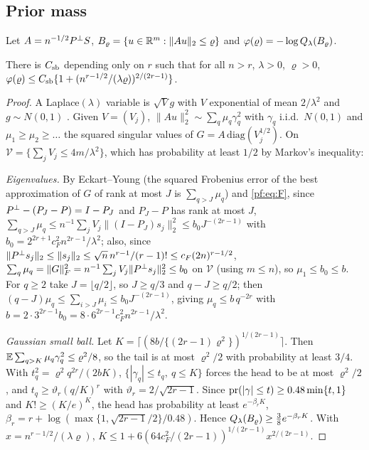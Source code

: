 \subsection{Prior mass}

Let $A=n^{-1/2}P^{\perp} S$, $B_\varrho=\{u\in\mathbb{R}^m:\|Au\|_2\le\varrho\}$ and $\varphi(\varrho)=-\log Q_\lambda(B_\varrho)$.

\begin{lemma}\label{pf:lem:sb}
There is $C_{\rm sb}$ depending only on $r$ such that for all $n>r$, $\lambda>0$, $\varrho>0$,
$\varphi(\varrho)\le C_{\rm sb}\{1+(n^{r-1/2}/(\lambda\varrho))^{2/(2r-1)}\}$.
\end{lemma}

\begin{proof}
A Laplace$(\lambda)$ variable is $\sqrt Vg$ with $V$ exponential of mean $2/\lambda^2$ and $g\sim N(0,1)$ \citep{andrews1974scale}. Given $V=(V_j)$, $\|Au\|_2^2\sim\sum_q\mu_q\gamma_q^2$ with $\gamma_q$ i.i.d.\ $N(0,1)$ and $\mu_1\ge\mu_2\ge\dots$ the squared singular values of $G=A\,\mathrm{diag}(V_j^{1/2})$. On $\mathcal V=\{\sum_jV_j\le4m/\lambda^2\}$, which has probability at least $1/2$ by Markov's inequality:

\emph{Eigenvalues.} By Eckart--Young (the squared Frobenius error of the best approximation of $G$ of rank at most $J$ is $\sum_{q>J}\mu_q$) and \eqref{pf:eq:F}, since $P^{\perp}-(P_J-P)=I-P_J$ and $P_J-P$ has rank at most $J$,
$\sum_{q>J}\mu_q\le n^{-1}\sum_jV_j\|(I-P_J)s_j\|_2^2\le b_0J^{-(2r-1)}$ with $b_0=2^{2r+1}c_F^2n^{2r-1}/\lambda^2$; also, since $\|P^{\perp} s_j\|_2\le\|s_j\|_2\le\sqrt n\,n^{r-1}/(r-1)!\le c_F(2n)^{r-1/2}$, $\sum_q\mu_q=\|G\|_F^2=n^{-1}\sum_jV_j\|P^{\perp} s_j\|_2^2\le b_0$ on $\mathcal V$ (using $m\le n$), so $\mu_1\le b_0\le b$. For $q\ge2$ take $J=\lfloor q/2\rfloor$, so $J\ge q/3$ and $q-J\ge q/2$; then $(q-J)\mu_q\le\sum_{i>J}\mu_i\le b_0J^{-(2r-1)}$, giving $\mu_q\le b\,q^{-2r}$ with $b=2\cdot3^{2r-1}b_0=8\cdot6^{2r-1}c_F^2n^{2r-1}/\lambda^2$.

\emph{Gaussian small ball.} Let $K=\lceil(8b/\{(2r-1)\varrho^2\})^{1/(2r-1)}\rceil$. Then $\mathbb{E}\sum_{q>K}\mu_q\gamma_q^2\le\varrho^2/8$, so the tail is at most $\varrho^2/2$ with probability at least $3/4$. With $t_q^2=\varrho^2q^{2r}/(2bK)$, $\{|\gamma_q|\le t_q,\ q\le K\}$ forces the head to be at most $\varrho^2/2$, and $t_q\ge\vartheta_r(q/K)^r$ with $\vartheta_r=2/\sqrt{2r-1}$. Since $\mathrm{pr}(|\gamma|\le t)\ge0.48\min\{t,1\}$ and $K!\ge(K/e)^K$, the head has probability at least $e^{-\beta_rK}$, $\beta_r=r+\log(\max\{1,\sqrt{2r-1}/2\}/0.48)$. Hence $Q_\lambda(B_\varrho)\ge\tfrac38e^{-\beta_rK}$. With $x=n^{r-1/2}/(\lambda\varrho)$, $K\le1+6(64c_F^2/(2r-1))^{1/(2r-1)}x^{2/(2r-1)}$.
\end{proof}

